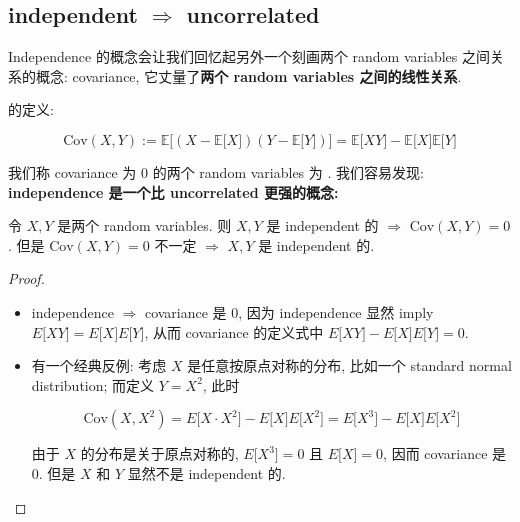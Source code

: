 \subsection{\texorpdfstring{independent \(\Longrightarrow\) uncorrelated}{independent \textbackslash Longrightarrow uncorrelated}}\label{independent-longrightarrow-uncorrelated}

Independence 的概念会让我们回忆起另外一个刻画两个 random variables 之间关系的概念: covariance, 它丈量了\textbf{两个 random variables 之间的线性关系}.

 的定义:

\[\text{Cov}(\mathit{X},\mathit{Y}) := \mathbb{E}\lbrack(\mathit{X} - \mathbb{E}\lbrack\mathit{X}\rbrack)(\mathit{Y} - \mathbb{E}\lbrack\mathit{Y}\rbrack)\rbrack = \mathbb{E}\lbrack\mathit{X}\mathit{Y}\rbrack - \mathbb{E}\lbrack\mathit{X}\rbrack\mathbb{E}\lbrack\mathit{Y}\rbrack\]

我们称 covariance 为 0 的两个 random variables 为 . 我们容易发现: \textbf{independence 是一个比 uncorrelated 更强的概念:}

\begin{proposition}{}

令 \(\mathit{X},\mathit{Y}\) 是两个 random variables. 则 \(\mathit{X},\mathit{Y}\) 是 independent 的 \(\Longrightarrow\) \(\text{Cov}(\mathit{X},\mathit{Y}) = 0\). 但是 \(\text{Cov}(\mathit{X},\mathit{Y}) = 0\) 不一定 \(\Longrightarrow\) \(\mathit{X},\mathit{Y}\) 是 independent 的.

\end{proposition}

\begin{proof}

\begin{itemize}
\item
  independence \(\Longrightarrow\) covariance 是 0, 因为 independence 显然 imply\(\mathit{E}\lbrack\mathit{X}\mathit{Y}\rbrack = \mathit{E}\lbrack\mathit{X}\rbrack\mathit{E}\lbrack\mathit{Y}\rbrack\), 从而 covariance 的定义式中 \(\mathit{E}\lbrack\mathit{X}\mathit{Y}\rbrack - \mathit{E}\lbrack\mathit{X}\rbrack\mathit{E}\lbrack\mathit{Y}\rbrack = 0\).
\item
  有一个经典反例: 考虑 \(\mathit{X}\) 是任意按原点对称的分布, 比如一个 standard normal distribution; 而定义 \(\mathit{Y} = \mathit{X}^{2}\), 此时

  \[\text{Cov}(\mathit{X},\mathit{X}^{2}) = \mathit{E}\lbrack\mathit{X} \cdot \mathit{X}^{2}\rbrack - \mathit{E}\lbrack\mathit{X}\rbrack\mathit{E}\lbrack\mathit{X}^{2}\rbrack = \mathit{E}\lbrack\mathit{X}^{3}\rbrack - \mathit{E}\lbrack\mathit{X}\rbrack\mathit{E}\lbrack\mathit{X}^{2}\rbrack\]

  由于 \(\mathit{X}\) 的分布是关于原点对称的, \(\mathit{E}\lbrack\mathit{X}^{3}\rbrack = 0\) 且 \(\mathit{E}\lbrack\mathit{X}\rbrack = 0\), 因而 covariance 是 0. 但是 \(\mathit{X}\) 和 \(\mathit{Y}\) 显然不是 independent 的.
\end{itemize}

\end{proof}

